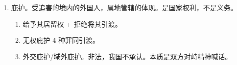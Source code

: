 \begin{enumerate}
\begin{enumerate}
\begin{kk}{政治犯}
                  \begin{enumerate}
                    \item 侵害外交代表、受国际保护人员。
                    \item 战争罪。
                    \item 危害人类罪。。
                    \item 劫机罪。
                  \end{enumerate}
                  \sjt 不得以政治犯为由拒绝引渡，但不意味必须引渡。这些罪伤天害理，无权获得庇护、保护。
                   年联合国反腐败公约、2003 年联合国打击跨国国有组织犯罪公约。
                  \begin{enumerate}
                    \item 公约可以但不必然作为缔约国之间产生引渡义务的法律依据。
                    \item 接材料，说理由。有义务接引渡材料，拒绝要说明理由。
                    \item 必须承担义务。不可以以双边条约对抗在多边公约下承担的义务。
                    \item 没有改变本国国民不引渡原则。仅以本国国民为由拒绝引渡的，要么引渡 \hz 本国进行起诉。
                  \end{enumerate}
                \end{kk}
          \item 庇护。受追害的境内的外国人，属地管辖的体现。是国家权利，不是义务。
                \begin{enumerate}
                  \item 给予其居留权 + 拒绝将其引渡。
                  \item 无权庇护 4 种罪同引渡。
                  \item 外交庇护/域外庇护。非法，我国不承认。本质是双方对峙精神喊话。
                \end{enumerate}
        \end{enumerate}
\end{enumerate}
